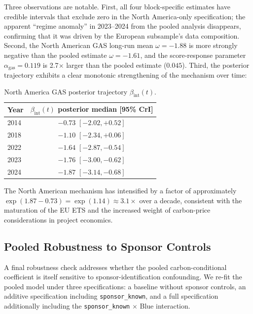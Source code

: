 \documentclass[11pt,a4paper]{article}
\newcommand{\bint}{\beta_{\mathrm{int}}}
\begin{document}
Three observations are notable. First, all four block-specific estimates have credible intervals that exclude zero in the North America-only specification; the apparent ``regime anomaly'' in 2023--2024 from the pooled analysis disappears, confirming that it was driven by the European subsample's data composition. Second, the North American GAS long-run mean $\omega = -1.88$ is more strongly negative than the pooled estimate $\omega = -1.61$, and the score-response parameter $\alpha_{\mathrm{gas}} = 0.119$ is 2.7$\times$ larger than the pooled estimate ($0.045$). Third, the posterior trajectory exhibits a clear monotonic strengthening of the mechanism over time:

\begin{table}[h!]
\centering
\caption{North America GAS posterior trajectory $\bint(t)$.}
\begin{tabular}{lc}
\toprule
Year & $\bint(t)$ posterior median [95\% CrI] \\
\midrule
2014 & $-0.73$ $[-2.02, +0.52]$ \\
2018 & $-1.10$ $[-2.34, +0.06]$ \\
2022 & $-1.64$ $[-2.87, -0.54]$ \\
2023 & $-1.76$ $[-3.00, -0.62]$ \\
2024 & $\mathbf{-1.87}$ $[-3.14, -0.68]$ \\
\bottomrule
\end{tabular}
\label{tab:ch7-na-gas}
\end{table}

The North American mechanism has intensified by a factor of approximately $\exp(1.87 - 0.73) = \exp(1.14) \approx 3.1\times$ over a decade, consistent with the maturation of the EU ETS and the increased weight of carbon-price considerations in project economics.


\subsection{Pooled Robustness to Sponsor Controls}
\label{sec:ch7-pooled-sponsor}

A final robustness check addresses whether the pooled carbon-conditional coefficient is itself sensitive to sponsor-identification confounding. We re-fit the pooled model under three specifications: a baseline without sponsor controls, an additive specification including \texttt{sponsor\_known}, and a full specification additionally including the \texttt{sponsor\_known} $\times$ Blue interaction.
\end{document}
